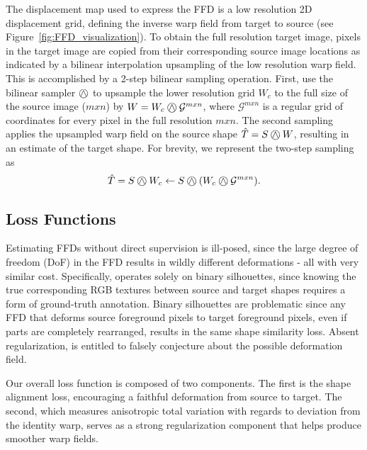 \documentclass[acmtog,timestamp]{acmart}%
\begin{document}
The displacement map used to express the FFD is a low resolution 2D displacement grid, defining the inverse warp field from target to source (see Figure~\ref{fig:FFD_visualization}). To obtain the full resolution target image, pixels in the target image are copied from their corresponding source image locations as indicated by a bilinear interpolation upsampling of the low resolution warp field. This is accomplished by a 2-step bilinear sampling operation. First, use the bilinear sampler $\oland$ to upsample the lower resolution grid $W_c$ to the full size of the source image ($mxn$) by $W = W_c \oland \mathcal{G}^{mxn}$,
where $\mathcal{G}^{mxn}$ is a regular grid of coordinates for every pixel in the full resolution $mxn$. 
The second sampling applies the upsampled warp field on the source shape $\hat{T} = S \oland W$,
resulting in an estimate of the target shape. For brevity, we represent the two-step sampling as
\begin{equation}
\hat{T} = S \oland W_c \leftarrow S \oland  (W_c \oland \mathcal{G}^{mxn}).
\label{eq:sampler}
\end{equation}\subsection{Loss Functions}\label{sec:loss}
Estimating FFDs without direct supervision is ill-posed, since the large degree of freedom (DoF) in the FFD results in wildly different deformations - all with very similar cost. Specifically, \ourmethod{} operates solely on binary silhouettes, since knowing the true corresponding RGB textures between source and target shapes requires a form of ground-truth annotation. Binary silhouettes are problematic since any FFD that deforms source foreground pixels to target foreground pixels, even if parts are completely rearranged, results in the same shape similarity loss. Absent regularization, \ourmethod{} is entitled to falsely conjecture about the possible deformation field.

Our overall loss function is composed of two components. The first is the shape alignment loss, encouraging a faithful deformation from source to target. The second, which measures anisotropic total variation with regards to deviation from the identity warp, serves as a strong regularization component that helps produce smoother warp fields. 
\end{document}
